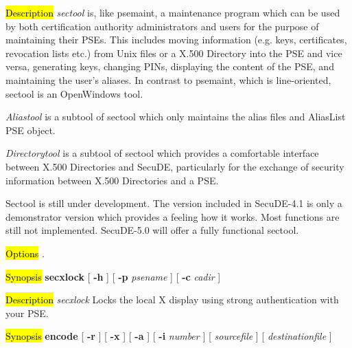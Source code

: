 \hl{Description}
{\em sectool} is, like psemaint,  a maintenance program which can be used by both
certification authority administrators and users for the purpose
of maintaining their PSEs. This includes moving information (e.g. keys,
certificates, revocation lists etc.) from Unix files or a X.500 Directory
into the PSE and vice versa, generating keys, changing PINs, displaying
the content of the PSE, and maintaining the user's aliases. In contrast
to psemaint, which is line-oriented, sectool is an OpenWindows tool.

{\em Aliastool} is a subtool of sectool which only maintains the alias
files and AliasList PSE object.

{\em Directorytool} is a subtool of sectool which provides a comfortable
interface between X.500 Directories and SecuDE, particularly for the
exchange of security information between X.500 Directories and a PSE.

Sectool is still under development. The version included in SecuDE-4.1
is only a demonstrator version which provides a feeling how it works.
Most functions are still not implemented. SecuDE-5.0 will offer a fully
functional sectool.

\hl{Options}
. 


  
 

\label{secxlock}
\hl{Synopsis}
{\bf secxlock} [ {\bf -h} ] [ {\bf -p} {\em psename} ] [ {\bf -c} {\em cadir} ]

\hl{Description}
{\em secxlock}  Locks the local X display using strong authentication with your PSE.

\label{encode}
\hl{Synopsis}
{\bf encode} [ {\bf -r} ] [ {\bf -x} ] [ {\bf -a} ] [ {\bf -i} {\em number} ] [ {\em sourcefile} ] [ {\em destinationfile} ]

